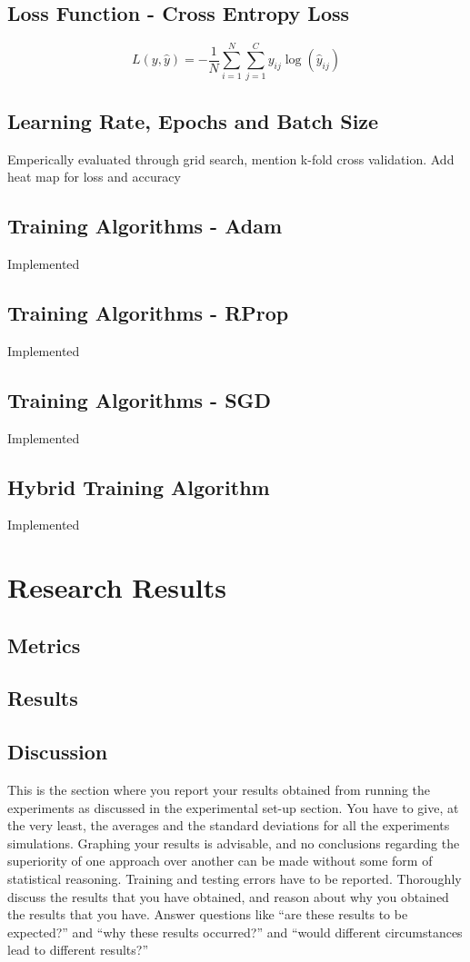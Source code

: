 \documentclass[conference]{IEEEtran}
\begin{document}
\subsection{Loss Function - Cross Entropy Loss}

\[
L(y, \hat{y}) = -\frac{1}{N} \sum_{i=1}^{N} \sum_{j=1}^{C} y_{ij} \log(\hat{y}_{ij})
\]

\subsection{Learning Rate, Epochs and Batch Size}
Emperically evaluated through grid search, mention k-fold cross validation. Add heat map for loss and accuracy
\subsection{Training Algorithms - Adam}
Implemented
\subsection{Training Algorithms - RProp}
Implemented
\subsection{Training Algorithms - SGD}
Implemented
\subsection{Hybrid Training Algorithm}
Implemented
\section{Research Results}
\subsection{Metrics}
\subsection{Results}
\subsection{Discussion}
This is the section where you report your results obtained from running the experiments as discussed in the experimental set-up section. You have to give, at the very least, the averages and the standard deviations for all the experiments simulations. Graphing your results is advisable, and no conclusions regarding the superiority of one approach over another can be made without some form of statistical reasoning. Training and testing errors have to be reported. Thoroughly discuss the results that you have obtained, and reason about why you obtained the results that you have. Answer questions like “are these results to be expected?” and “why these results occurred?” and “would different circumstances lead to different results?”
\end{document}
